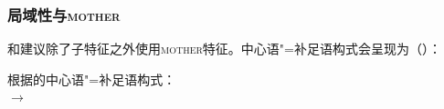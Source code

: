 \subsubsection{局域性与\textsc{mother}}
\label{sec-mother}

\mbox{}\citet*[475--489]{SWB2003a}和\citet{Sag2007a,Sag2012a}建议除了子特征之外使用\textsc{mother}特征。中心语"=补足语构式会呈现为（）：

\eas
根据\citet*[481]{SWB2003a}的中心语"=补足语构式：\\
 $\to$\\
\zs

